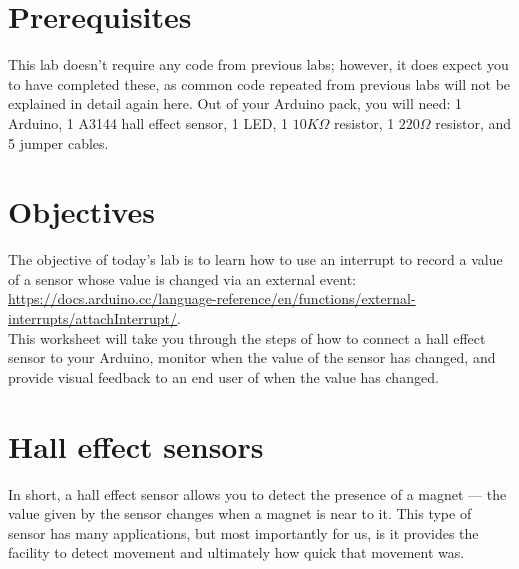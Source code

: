\documentclass[11pt,a4paper]{article}
\begin{document}
\pagestyle{fancy}

\section*{Prerequisites}
This lab doesn't require any code from previous labs; however, it does expect you to have completed these, as common code repeated from previous labs will not be explained in detail again here. Out of your Arduino pack, you will need: 1 Arduino, 1 A3144 hall effect sensor, 1 LED, 1 $10K\Omega$ resistor, 1 $220\Omega$ resistor, and 5 jumper cables.

\section*{Objectives}
The objective of today's lab is to learn how to use an interrupt to record a value of a sensor whose value is changed via an external event: \url{https://docs.arduino.cc/language-reference/en/functions/external-interrupts/attachInterrupt/}.\\

\noindent
This worksheet will take you through the steps of how to connect a hall effect sensor to your Arduino, monitor when the value of the sensor has changed, and provide visual feedback to an end user of when the value has changed.

\section*{Hall effect sensors}
In short, a hall effect sensor allows you to detect the presence of a magnet --- the value given by the sensor changes when a magnet is near to it. This type of sensor has many applications, but most importantly for us, is it provides the facility to detect movement and ultimately how quick that movement was.\\
\end{document}
